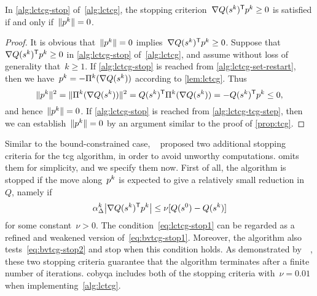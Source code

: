 
\begin{proposition}
    \label{prop:lctcg}
    In \cref{alg:lctcg-stop} of~\cref{alg:lctcg}, the stopping criterion~$\nabla Q (\sstep[k])^{\T} \pstep[k] \ge 0$ is satisfied if and only if~$\norm{\pstep[k]} = 0$.
\end{proposition}

\begin{proof}
    It is obvious that~$\norm{\pstep[k]} = 0$ implies~$\nabla Q (\sstep[k])^{\T} \pstep[k] \ge 0$.
    Suppose that~$\nabla Q (\sstep[k])^{\T} \pstep[k] \ge 0$ in \cref{alg:lctcg-stop} of~\cref{alg:lctcg}, and assume without loss of generality that~$k \ge 1$.
    If \cref{alg:lctcg-stop} is reached from \cref{alg:lctcg-set-restart}, then we have~$\pstep[k] = -\Pi^k(\nabla Q(\sstep[k]))$ according to \cref{lem:lctcg}.
    Thus
    \begin{equation*}
        \norm{\pstep[k]}^2 = \norm{\Pi^k(\nabla Q(\sstep[k]))}^2 = Q (\sstep[k])^{\T}  \Pi^k(\nabla Q(\sstep[k])) = - Q (\sstep[k])^{\T}  \pstep[k] \le 0,
    \end{equation*}
    and hence~$\norm{\pstep[k]} = 0$.
    If \cref{alg:lctcg-stop} is reached from \cref{alg:lctcg-tcg-step}, then we can establish~$\norm{\pstep[k]} = 0$ by an argument similar to the proof of \cref{prop:tcg}.
\end{proof}

Similar to the bound-constrained case, ~\cite[\S~2]{Powell_2015} proposed two additional stopping criteria for the \gls{tcg} algorithm, in order to avoid unworthy computations.
 omits them for simplicity, and we specify them now.
First of all, the algorithm is stopped if the move along~$\pstep[k]$ is expected to give a relatively small reduction in~$Q$, namely if
\begin{equation}
    \label{eq:lctcg-stop1}
    \alpha_{\rad}^k \abs[\big]{\nabla Q(\sstep[k])^{\T} \pstep[k]} \le \nu [Q(\sstep[0]) - Q(\sstep[k])]
\end{equation}
for some constant~$\nu > 0$.
The condition~\cref{eq:lctcg-stop1} can be regarded as a refined and weakened version of~\cref{eq:bvtcg-stop1}.
Moreover, the algorithm also tests~\cref{eq:bvtcg-stop2} and stop when this condition holds.
As demonstrated by~\citeauthor{Powell_2015}~\cite[\S~5]{Powell_2015}, these two stopping criteria guarantee that the algorithm terminates after a finite number of iterations.
\Gls{cobyqa} includes both of the stopping criteria with~$\nu = 0.01$ when implementing~\cref{alg:lctcg}.

